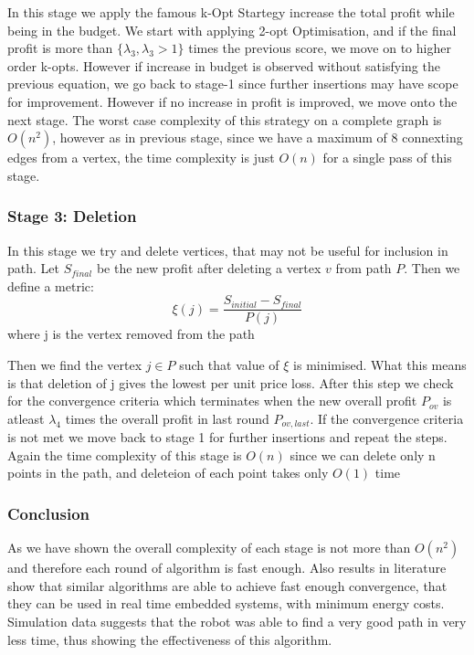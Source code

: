 \documentclass{article}
\begin{document}
In this stage we apply the famous k-Opt Startegy \cite{opt1} \cite{opt2} increase the total profit while being in the budget. 
We start with applying 2-opt Optimisation, and if the final profit is more than $\{ \lambda_{3} , \lambda_{3} > 1 \}$ times the previous score, we move on to higher order k-opts. 
However if increase in budget is observed without satisfying the previous equation, we go back to stage-1 since further insertions may have scope for improvement. 
However if no increase in profit is improved, we move onto the next stage. The worst case complexity of this strategy on a complete graph is $O(n^2)$, however as in previous stage, since we have a maximum of 8 connexting edges from a vertex, the time complexity is just $O(n)$ for a single pass of this stage.

\subsubsection{Stage 3: Deletion}

In this stage we try and delete vertices, that may not be useful for inclusion in path.
Let $S_{final}$ be the new profit after deleting a vertex $v$ from path $P$. Then we define a metric: 
\begin{equation}  \label{eq5}
    \xi (j)= \frac{S_{initial} - S_{final}}{P(j)}   
\end{equation}
where j is the vertex removed from the path

Then we find the vertex $j \in P$ such that value of $\xi$ is minimised. What this means is that deletion of j gives the lowest per unit price loss.
After this step we check for the convergence criteria which terminates when the new overall profit $P_{ov}$ is atleast $\lambda_4$ times the overall profit in last round $P_{ov,last}$.
If the convergence criteria is not met we move back to stage 1 for further insertions and repeat the steps. 
Again the time complexity of this stage is $O(n)$ since we can delete only n points in the path, and deleteion of each point takes only $O(1)$ time

\subsubsection{Conclusion}

As we have shown the overall complexity of each stage is not more than $O(n^2)$ and therefore each round of algorithm is fast enough.
Also results in literature show that similar algorithms are able to achieve fast enough convergence, that they can be used in real time embedded systems, with minimum energy costs. \cite{RAMESH1991151}
Simulation data suggests that the robot was able to find a very good path in very less time, thus showing the effectiveness of this algorithm.
\end{document}
